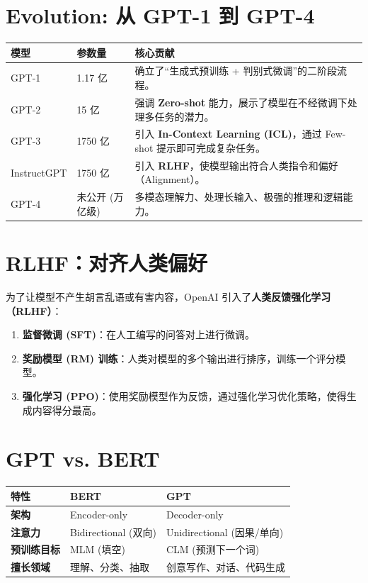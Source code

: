 \documentclass[12pt, a4paper]{article}
\begin{document}
\section{Evolution: 从 GPT-1 到 GPT-4}

\begin{table}[h]
\centering
\begin{tabularx}{\textwidth}{|l|l|X|}
\hline
\textbf{模型} & \textbf{参数量} & \textbf{核心贡献} \\
\hline
GPT-1 & 1.17 亿 & 确立了“生成式预训练 + 判别式微调”的二阶段流程。 \\
\hline
GPT-2 & 15 亿 & 强调 \textbf{Zero-shot} 能力，展示了模型在不经微调下处理多任务的潜力。 \\
\hline
GPT-3 & 1750 亿 & 引入 \textbf{In-Context Learning (ICL)}，通过 Few-shot 提示即可完成复杂任务。 \\
\hline
InstructGPT & 1750 亿 & 引入 \textbf{RLHF}，使模型输出符合人类指令和偏好（Alignment）。 \\
\hline
GPT-4 & 未公开 (万亿级) & 多模态理解力、处理长输入、极强的推理和逻辑能力。 \\
\hline
\end{tabularx}
\end{table}

\section{RLHF：对齐人类偏好}
为了让模型不产生胡言乱语或有害内容，OpenAI 引入了\textbf{人类反馈强化学习（RLHF）}：
\begin{enumerate}
    \item \textbf{监督微调 (SFT)}：在人工编写的问答对上进行微调。
    \item \textbf{奖励模型 (RM) 训练}：人类对模型的多个输出进行排序，训练一个评分模型。
    \item \textbf{强化学习 (PPO)}：使用奖励模型作为反馈，通过强化学习优化策略，使得生成内容得分最高。
\end{enumerate}

\section{GPT vs. BERT}
\begin{table}[h]
\centering
\begin{tabularx}{\textwidth}{|l|X|X|}
\hline
\textbf{特性} & \textbf{BERT} & \textbf{GPT} \\
\hline
\textbf{架构} & Encoder-only & Decoder-only \\
\hline
\textbf{注意力} & Bidirectional (双向) & Unidirectional (因果/单向) \\
\hline
\textbf{预训练目标} & MLM (填空) & CLM (预测下一个词) \\
\hline
\textbf{擅长领域} & 理解、分类、抽取 & 创意写作、对话、代码生成 \\
\hline
\end{tabularx}
\end{table}
\end{document}
